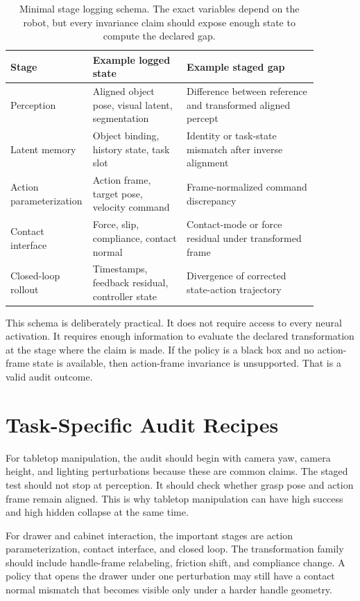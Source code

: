 \documentclass{article}
\begin{document}
\begin{table}[t]
\centering
\small
\begin{tabular}{p{0.16\linewidth}p{0.30\linewidth}p{0.42\linewidth}}
\toprule
Stage & Example logged state & Example staged gap \\
\midrule
Perception & Aligned object pose, visual latent, segmentation & Difference between reference and transformed aligned percept \\
Latent memory & Object binding, history state, task slot & Identity or task-state mismatch after inverse alignment \\
Action parameterization & Action frame, target pose, velocity command & Frame-normalized command discrepancy \\
Contact interface & Force, slip, compliance, contact normal & Contact-mode or force residual under transformed frame \\
Closed-loop rollout & Timestamps, feedback residual, controller state & Divergence of corrected state-action trajectory \\
\bottomrule
\end{tabular}
\caption{Minimal stage logging schema. The exact variables depend on the robot, but every invariance claim should expose enough state to compute the declared gap.}
\label{tab:logging-schema}
\end{table}

This schema is deliberately practical. It does not require access to every neural activation. It requires enough information to evaluate the declared transformation at the stage where the claim is made. If the policy is a black box and no action-frame state is available, then action-frame invariance is unsupported. That is a valid audit outcome.

\section{Task-Specific Audit Recipes}

For tabletop manipulation, the audit should begin with camera yaw, camera height, and lighting perturbations because these are common claims. The staged test should not stop at perception. It should check whether grasp pose and action frame remain aligned. This is why tabletop manipulation can have high success and high hidden collapse at the same time.

For drawer and cabinet interaction, the important stages are action parameterization, contact interface, and closed loop. The transformation family should include handle-frame relabeling, friction shift, and compliance change. A policy that opens the drawer under one perturbation may still have a contact normal mismatch that becomes visible only under a harder handle geometry.
\end{document}
